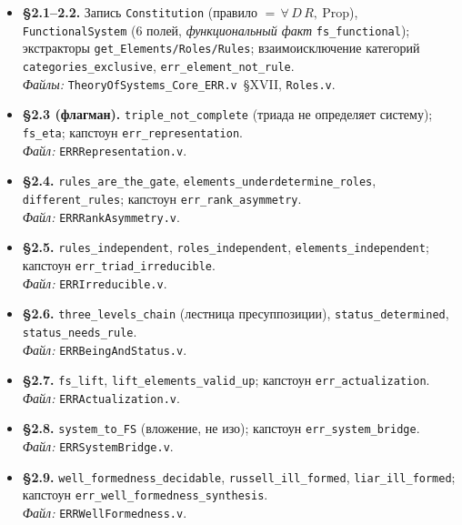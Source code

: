 \documentclass[12pt,a4paper]{article}
\begin{document}
\begin{itemize}\itemsep2pt
\item \textbf{§2.1--2.2.} Запись \texttt{Constitution} (правило $=\,\forall\,D\,R,\ \mathrm{Prop}$),
\texttt{FunctionalSystem} (6 полей, \emph{функциональный факт} \texttt{fs\_functional}); экстракторы
\texttt{get\_Elements/Roles/Rules}; взаимоисключение категорий \texttt{categories\_exclusive},
\texttt{err\_element\_not\_rule}.\\
\emph{Файлы:} \texttt{TheoryOfSystems\_Core\_ERR.v}~§XVII, \texttt{Roles.v}.

\item \textbf{§2.3 (флагман).} \texttt{triple\_not\_complete} (триада не определяет систему);
\texttt{fs\_eta}; капстоун \texttt{err\_representation}.\\
\emph{Файл:} \texttt{ERRRepresentation.v}.

\item \textbf{§2.4.} \texttt{rules\_are\_the\_gate}, \texttt{elements\_underdetermine\_roles},
\texttt{different\_rules}; капстоун \texttt{err\_rank\_asymmetry}.\\
\emph{Файл:} \texttt{ERRRankAsymmetry.v}.

\item \textbf{§2.5.} \texttt{rules\_independent}, \texttt{roles\_independent},
\texttt{elements\_independent}; капстоун \texttt{err\_triad\_irreducible}.\\
\emph{Файл:} \texttt{ERRIrreducible.v}.

\item \textbf{§2.6.} \texttt{three\_levels\_chain} (лестница пресуппозиции),
\texttt{status\_determined}, \texttt{status\_needs\_rule}.\\
\emph{Файл:} \texttt{ERRBeingAndStatus.v}.

\item \textbf{§2.7.} \texttt{fs\_lift}, \texttt{lift\_elements\_valid\_up}; капстоун
\texttt{err\_actualization}.\\
\emph{Файл:} \texttt{ERRActualization.v}.

\item \textbf{§2.8.} \texttt{system\_to\_FS} (вложение, не изо); капстоун
\texttt{err\_system\_bridge}.\\
\emph{Файл:} \texttt{ERRSystemBridge.v}.

\item \textbf{§2.9.} \texttt{well\_formedness\_decidable}, \texttt{russell\_ill\_formed},
\texttt{liar\_ill\_formed}; капстоун \texttt{err\_well\_formedness\_synthesis}.\\
\emph{Файл:} \texttt{ERRWellFormedness.v}.
\end{itemize}
\normalsize

\end{document}
